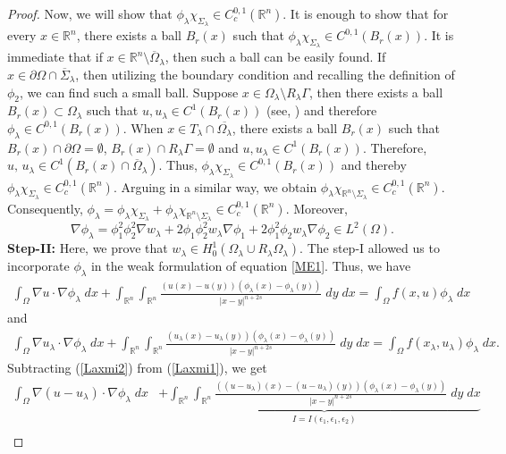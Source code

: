 \documentclass[11pt, notitlepage]{article}
\def\R{\mathbb{R}}
\begin{document}
{\begin{proof}
Now, we will show that $\phi_\lambda\chi_{\Sigma_\lambda}\in C^{0,1}_c(\R^n)$. It is enough to show that for every $x\in \R^n$, there exists a ball $B_r(x)$ such that $\phi_\lambda \chi_{\Sigma_\lambda}\in C^{0,1}(B_r(x))$. It is immediate that if $x\in\R^n\setminus\overline{\Omega}_\lambda$, then such a ball can be easily found. If $x\in \partial\Omega\cap \overline{\Sigma}_\lambda$, then utilizing the boundary condition and recalling the definition of $\phi_2$, we can find such a small ball. Suppose $x\in \Omega_\lambda\setminus R_\lambda\Gamma$, then there exists a ball $B_r(x)\subset\Omega_\lambda$ such that $u, u_\lambda\in C^1(B_r(x))$ (see, \cite{ValdinociMathZ22}) and therefore $\phi_\lambda\in C^{0,1}(B_r(x))$. When $x\in T_\lambda\cap\overline{\Omega_\lambda}$, there exists a ball $B_r(x)$ such that $B_r(x)\cap\partial\Omega=\emptyset$, $B_r(x)\cap R_\lambda\Gamma=\emptyset$ and $u,u_\lambda\in C^1(B_r(x))$. Therefore, $u,\,u_\lambda\in C^1(B_r(x)\cap \overline{\Omega}_\lambda)$. Thus, $\phi_\lambda \chi_{\Sigma_\lambda}\in C^{0,1}(B_r(x))$ and thereby $\phi_\lambda\chi_{\Sigma_\lambda}\in C^{0,1}_c(\R^n)$. Arguing in a similar way, we obtain $\phi_\lambda\chi_{\R^n\setminus\Sigma_\lambda}\in C^{0,1}_c(\R^n)$. Consequently, $\phi_\lambda=\phi_\lambda\chi_{\Sigma_\lambda}+\phi_\lambda\chi_{\R^n\setminus\Sigma_\lambda}\in C^{0,1}_c(\R^n)$. Moreover, $$\nabla\phi_\lambda=\phi_1^2\phi_2^2\nabla w_\lambda+2\phi_1\phi_2^2w_\lambda\nabla\phi_1+2\phi_1^2\phi_2w_\lambda\nabla\phi_2\in L^2(\Omega).$$
\textbf{Step-II:} Here, we prove that $w_\lambda\in H^1_0(\Omega_\lambda\cup R_\lambda\Omega_\lambda)$. The step-I allowed us to incorporate $\phi_\lambda$ in the weak formulation of equation \eqref{ME1}. Thus, we have
\begin{align}\label{Laxmi1}
    \int_\Omega \nabla u\cdot\nabla\phi_\lambda\;dx+\int_{\R^n}\int_{\R^n}\frac{(u(x)-u(y))(\phi_\lambda(x)-\phi_\lambda(y))}{|x-y|^{n+2s}}\;dy\;dx=\int_\Omega f(x,u)\phi_\lambda\;dx
\end{align}
and
\begin{align}\label{Laxmi2}
    \int_\Omega \nabla u_\lambda\cdot\nabla\phi_\lambda\;dx+\int_{\R^n}\int_{\R^n}\frac{(u_\lambda(x)-u_\lambda(y))(\phi_\lambda(x)-\phi_\lambda(y))}{|x-y|^{n+2s}}\;dy\;dx=\int_\Omega f(x_\lambda,u_\lambda)\phi_\lambda\;dx.
\end{align}
Subtracting (\ref{Laxmi2}) from (\ref{Laxmi1}), we get
\begin{align}\label{Laxmi3}
    \int_\Omega \nabla (u-u_\lambda)\cdot\nabla\phi_\lambda\;dx&+\underbrace{\int_{\R^n}\int_{\R^n}\frac{((u-u_\lambda)(x)-(u-u_\lambda)(y))(\phi_\lambda(x)-\phi_\lambda(y))}{|x-y|^{n+2s}}\;dy\;dx}_{I=I(\epsilon_1,\epsilon_1,\epsilon_2)}\nonumber\\

\end{align}
\end{proof}}
\end{document}
